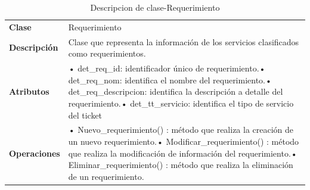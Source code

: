 \begin{table}[H]
	\centering
	\caption{Descripcion de clase-Requerimiento}
	\begin{tabular}{|p{6.145em}|p{28.07em}|}
		\toprule
		\rowcolor[rgb]{ .125,  .216,  .392} \multicolumn{2}{|p{34.215em}|}{\textcolor[rgb]{ 1,  1,  1}{\textbf{Clase Requerimiento}}} \\
		\midrule
		\textbf{Clase} & \multicolumn{1}{l|}{Requerimiento} \\
		\midrule
		\textbf{Descripción} & Clase que representa la información de los servicios clasificados como requerimientos. \\
		\midrule
		\textbf{Atributos } & •	det\_req\_id: identificador único de requerimiento.\newline{}•	det\_req\_nom: identifica el nombre del requerimiento.\newline{}•	det\_req\_descripcion: identifica la descripción a detalle del requerimiento.\newline{}•	det\_tt\_servicio: identifica el tipo de servicio del ticket  \\
		\midrule
		\textbf{Operaciones} & •	Nuevo\_requerimiento()   :  método que realiza la creación de un nuevo requerimiento.\newline{}•	Modificar\_requerimiento()  : método que  realiza la modificación de información del requerimiento.\newline{}•	Eliminar\_requerimiento() : método que realiza la eliminación de un requerimiento. \\
		\bottomrule
	\end{tabular}%
	\label{tab:CLAS11}%
\end{table}%


